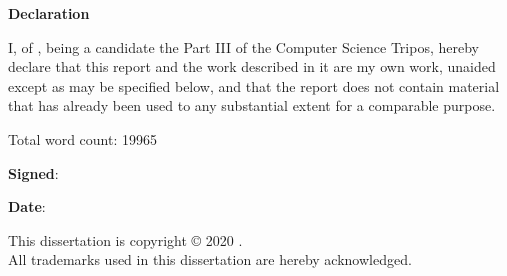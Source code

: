 \newpage
{\Huge \bf Declaration}

\vspace{24pt} 

I, \authorname of \authorcollege, being a candidate the Part III of
the Computer Science Tripos, hereby declare that this report and the
work described in it are my own work, unaided except as may be
specified below, and that the report does not contain material that
has already been used to any substantial extent for a comparable
purpose.

\vspace{24pt}
Total word count: 19965

\vspace{60pt}
\textbf{Signed}: 

\vspace{12pt}
\textbf{Date}:


\vfill

This dissertation is copyright \copyright{} 2020 \authorname. 
\\
All trademarks used in this dissertation are hereby acknowledged.



\newpage
\vspace*{\fill}
